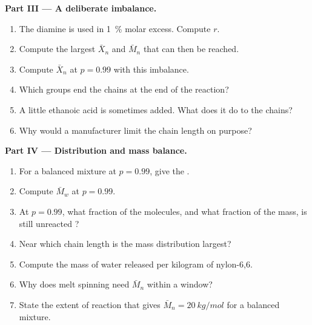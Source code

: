 \begin{problem}
\medskip
\noindent\textbf{Part III --- A deliberate imbalance.}
\begin{enumerate}[resume]
  \item The diamine is used in 1~\% molar excess. Compute $r$.
  \item Compute the largest $\bar X_n$ and $\bar M_n$ that can then be reached.
  \item Compute $\bar X_n$ at $p = 0.99$ with this imbalance.
  \item Which groups end the chains at the end of the reaction?
  \item A little ethanoic acid is sometimes added. What does it do to the chains?
  \item Why would a manufacturer limit the chain length on purpose?
\end{enumerate}

\medskip
\noindent\textbf{Part IV --- Distribution and mass balance.}
\begin{enumerate}[resume]
  \item For a balanced mixture at $p = 0.99$, give the .
  \item Compute $\bar M_w$ at $p = 0.99$.
  \item At $p = 0.99$, what fraction of the molecules, and what fraction of the mass, is still
        unreacted ?
  \item Near which chain length is the mass distribution largest?
  \item Compute the mass of water released per kilogram of nylon-6,6.
  \item Why does melt spinning need $\bar M_n$ within a window?
  \item State the extent of reaction that gives $\bar M_n = \qty{20}{kg/mol}$ for a balanced mixture.
\end{enumerate}
\end{problem}
